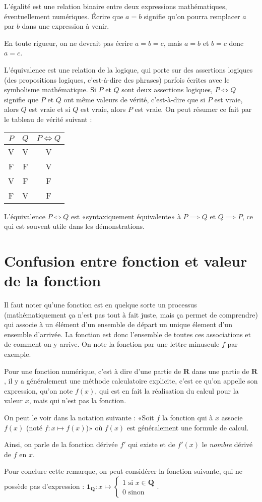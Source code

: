 \documentclass[12pt,a4paper,french]{article}
\newcommand{\R}{\mathbf{R}}
\theoremstyle{break}
\theoremstyle{plain}
\theoremstyle{nonumberplain}
\theoremstyle{nonumberbreak}
\begin{document}
L'égalité est une relation binaire entre deux expressions mathématiques,
éventuellement numériques. Écrire que $a = b$ signifie qu'on pourra
remplacer $a$ par $b$ dans une expression à venir.

En toute rigueur, on ne devrait pas écrire $a = b = c$, mais $a = b$ et
$b = c$ donc $a = c$.

L'équivalence est une relation de la logique, qui porte sur des
assertions logiques (des propositions logiques, c'est-à-dire des
phrases) parfois écrites avec le symbolisme mathématique. Si $P$ et $Q$
sont deux assertions logiques, $P\iff Q$ signifie que $P$ et $Q$ ont
même valeurs de vérité, c'est-à-dire que si $P$ est vraie, alors $Q$ est
vraie et si $Q$ est vraie, alors $P$ est vraie. On peut résumer ce fait
par le tableau de vérité suivant :
\begin{center}
  \begin{tabular}{|*{3}{c|}}\hline
    $P$ & $Q$ & $P \iff Q$ \\ \hline
    V & V & V \\ \hline
    F & F & V \\ \hline
    V & F & F \\ \hline
    F & V & F \\ \hline
  \end{tabular}
\end{center}

L'équivalence $P \iff Q$ est «syntaxiquement équivalente» à $P \implies
Q$ et $Q \implies P$, ce qui est souvent utile dans les démonstrations.

\section{Confusion entre fonction et valeur de la fonction}

Il faut noter qu'une fonction est en quelque sorte un processus
(mathématiquement ça n'est pas tout à fait juste, mais ça permet de
comprendre) qui associe à un élément d'un ensemble de départ un unique
élement d'un ensemble d'arrivée. La fonction est donc l'ensemble de
toutes ces associations et de comment on y arrive. On note la fonction
par une lettre minuscule $f$ par exemple.

Pour une fonction numérique, c'est à dire d'une partie de $\R$ dans une
partie de $\R$, il y a généralement une méthode calculatoire explicite,
c'est ce qu'on appelle son expression, qu'on note $f(x)$, qui est en
fait la réalisation du calcul pour la valeur $x$, mais qui n'est pas la
fonction.

On peut le voir dans la notation suivante : «Soit $f$ la fonction qui à
$x$ associe $f(x)$ (noté $f:x\mapsto f(x)$)» où $f(x)$ est généralement
une formule de calcul.

Ainsi, on parle de la fonction dérivée $f'$ qui existe et de $f'(x)$ le
\emph{nombre} dérivé de $f$ en $x$.

Pour conclure cette remarque, on peut considérer la fonction suivante,
qui ne possède pas d'expression : $\mathbf{1}_{\mathbf{Q}}:x\mapsto
\left\lbrace\begin{matrix} 1\text{ si }x\in\mathbf{Q}\\ 0\text{ sinon
}\end{matrix}\right.$.
\end{document}
